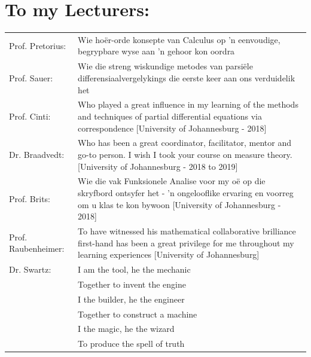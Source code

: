 \documentclass[12pt, oneside]{book}
\begin{document}
\pagebreak


\newpage
\section*{To my Lecturers:}
%

\begin{flushleft}

\begin{table}[h]
\begin{tabularx}{\textwidth}{l X}

Prof. Pretorius: & Wie ho{\"e}r-orde konsepte van Calculus op 'n eenvoudige, begrypbare wyse aan 'n gehoor kon oordra \\[0.2cm]

Prof. Sauer: & Wie die streng wiskundige metodes van parsi{\"e}le differensiaalvergelykings die eerste keer aan ons verduidelik het \\[0.2cm]

Prof. Cinti: & Who played a great influence in my learning of the methods and techniques of partial differential equations via correspondence [University of Johannesburg - 2018]\\[0.2cm]

Dr. Braadvedt: & Who has been a great coordinator, facilitator, mentor and go-to person. I wish I took your course on measure theory. [University of Johannesburg - 2018 to 2019]\\[0.2cm]

Prof. Brits: & Wie die vak Funksionele Analise voor my o{\"e} op die skryfbord ontsyfer het - 'n ongelooflike ervaring en voorreg om u klas te kon bywoon [University of Johannesburg - 2018]\\[0.2cm]

Prof. Raubenheimer:	& To have witnessed his mathematical collaborative brilliance first-hand has been a great privilege for me throughout my learning experiences [University of Johannesburg] \\[0.2cm]


Dr. Swartz:  		& I am the tool, he the mechanic\\[0.2cm]
{}					& Together to invent the engine\\[0.2cm]			
{}					& I the builder, he the engineer\\[0.2cm]		
{}					& Together to construct a machine\\[0.2cm]						
{}					& I the magic, he the wizard\\[0.2cm]
{}					& To produce the spell of truth\\[0.2cm]

\end{tabularx}
\end{table}

\end{flushleft}
\end{document}

